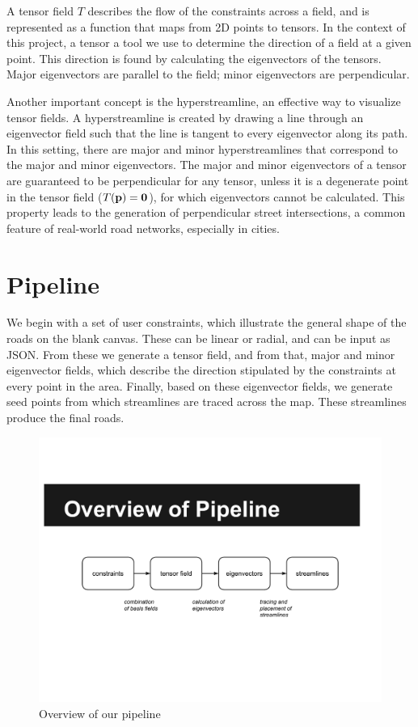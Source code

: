 \documentclass[twocolumn]{article}
\begin{document}
A tensor field $T$ describes the flow of the constraints across a field, and is
represented as a function that maps from 2D points to tensors. In the context
of this project, a tensor a tool we use to determine the direction of a field
at a given point. This direction is found by calculating the eigenvectors of
the tensors. Major eigenvectors are parallel to the field; minor eigenvectors
are perpendicular.

Another important concept is the hyperstreamline, an effective way to visualize
tensor fields. A hyperstreamline is created by drawing a line through an
eigenvector field such that the line is tangent to every eigenvector along its
path. In this setting, there are major and minor hyperstreamlines that
correspond to the major and minor eigenvectors. The major and minor
eigenvectors of a tensor are guaranteed to be perpendicular for any tensor,
unless it is a degenerate point in the tensor field ($T(\bf p)=0$), for which
eigenvectors cannot be calculated. This property leads to the generation of
perpendicular street intersections, a common feature of real-world road
networks, especially in cities.

\section{Pipeline}\label{sec:pipeline}
We begin with a set of user constraints, which illustrate the general shape of
the roads on the blank canvas. These can be linear or radial, and can be input
as JSON. From these we generate a tensor field, and from that, major and minor
eigenvector fields, which describe the direction stipulated by the constraints
at every point in the area. Finally, based on these eigenvector fields, we
generate seed points from which streamlines are traced across the map. These
streamlines produce the final roads.

\begin{figure}[t!]
\begin{center}
    \includegraphics[width=5.5in]{images/pipeline.pdf}
\end{center}
\caption{Overview of our pipeline}
\label{fig:pipeline}
\end{figure}
\end{document}
